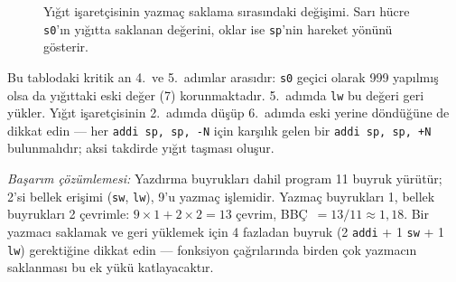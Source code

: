 \begin{ornek}[4.3]
\begin{figure}[H]
\centering
{}
\caption[Yığıt işaretçisinin yazmaç saklama sırasındaki değişimi]{Yığıt işaretçisinin yazmaç saklama sırasındaki değişimi. Sarı hücre \texttt{s0}'ın yığıtta saklanan değerini, oklar ise \texttt{sp}'nin hareket yönünü gösterir.}
\label{fig:yigit-buyume}
\end{figure}

Bu tablodaki kritik an 4.~ve 5.~adımlar arasıdır: \texttt{s0} geçici olarak 999 yapılmış olsa da yığıttaki eski değer (7) korunmaktadır. 5.~adımda \texttt{lw} bu değeri geri yükler. Yığıt işaretçisinin 2.~adımda düşüp 6.~adımda eski yerine döndüğüne de dikkat edin --- her \texttt{addi sp, sp, -N} için karşılık gelen bir \texttt{addi sp, sp, +N} bulunmalıdır; aksi takdirde yığıt taşması oluşur.

\emph{Başarım çözümlemesi:} Yazdırma buyrukları dahil program 11 buyruk yürütür; 2'si bellek erişimi (\texttt{sw}, \texttt{lw}), 9'u yazmaç işlemidir. Yazmaç buyrukları 1, bellek buyrukları 2 çevrimle: $9 \times 1 + 2 \times 2 = 13$ çevrim, BBÇ~$= 13/11 \approx 1{,}18$. Bir yazmacı saklamak ve geri yüklemek için 4 fazladan buyruk (2 \texttt{addi} + 1 \texttt{sw} + 1 \texttt{lw}) gerektiğine dikkat edin --- fonksiyon çağrılarında birden çok yazmacın saklanması bu ek yükü katlayacaktır.
\end{ornek}

